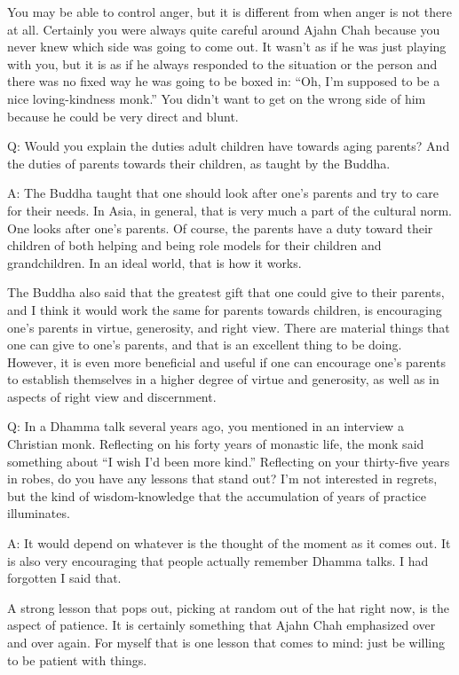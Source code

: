 You may be able to control anger, but it is different from when anger is
not there at all. Certainly you were always quite careful around Ajahn
Chah because you never knew which side was going to come out. It wasn’t
as if he was just playing with you, but it is as if he always responded
to the situation or the person and there was no fixed way he was going
to be boxed in: “Oh, I’m supposed to be a nice loving-kindness monk.”
You didn’t want to get on the wrong side of him because he could be very
direct and blunt.

Q: Would you explain the duties adult children have towards aging
parents? And the duties of parents towards their children, as taught by
the Buddha.

A: The Buddha taught that one should look after one’s parents and try to
care for their needs. In Asia, in general, that is very much a part of
the cultural norm. One looks after one’s parents. Of course, the parents
have a duty toward their children of both helping and being role models
for their children and grandchildren. In an ideal world, that is how it
works.

The Buddha also said that the greatest gift that one could give to their
parents, and I think it would work the same for parents towards
children, is encouraging one’s parents in virtue, generosity, and right
view. There are material things that one can give to one’s parents, and
that is an excellent thing to be doing. However, it is even more
beneficial and useful if one can encourage one’s parents to establish
themselves in a higher degree of virtue and generosity, as well as in
aspects of right view and discernment.

Q: In a Dhamma talk several years ago, you mentioned in an interview a
Christian monk. Reflecting on his forty years of monastic life, the monk
said something about “I wish I’d been more kind.” Reflecting on your
thirty-five years in robes, do you have any lessons that stand out? I’m
not interested in regrets, but the kind of wisdom-knowledge that the
accumulation of years of practice illuminates.

A: It would depend on whatever is the thought of the moment as it comes
out. It is also very encouraging that people actually remember Dhamma
talks. I had forgotten I said that.

A strong lesson that pops out, picking at random out of the hat right
now, is the aspect of patience. It is certainly something that Ajahn
Chah emphasized over and over again. For myself that is one lesson that
comes to mind: just be willing to be patient with things.

